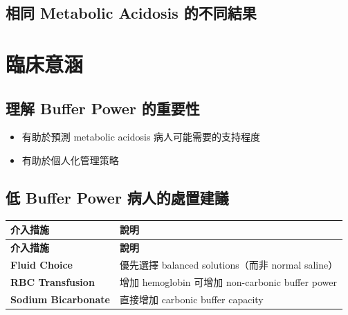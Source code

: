 \documentclass[12pt,a4paper]{article}
\begin{document}
\subsection{相同 Metabolic Acidosis 的不同結果}


\section{臨床意涵}

\subsection{理解 Buffer Power 的重要性}

\begin{itemize}
    \item 有助於預測 metabolic acidosis 病人可能需要的支持程度
    \item 有助於個人化管理策略
\end{itemize}

\subsection{低 Buffer Power 病人的處置建議}

\begin{longtable}{p{4.5cm}p{9.5cm}}
\toprule
\textbf{介入措施} & \textbf{說明} \\
\midrule
\endfirsthead

\toprule
\textbf{介入措施} & \textbf{說明} \\
\midrule
\endhead

\bottomrule
\endfoot

\textbf{Fluid Choice} & 優先選擇 balanced solutions（而非 normal saline）\\
\midrule
\textbf{RBC Transfusion} & 增加 hemoglobin 可增加 non-carbonic buffer power \\
\midrule
\textbf{Sodium Bicarbonate} & 直接增加 carbonic buffer capacity \\
\bottomrule
\end{longtable}
\end{document}
